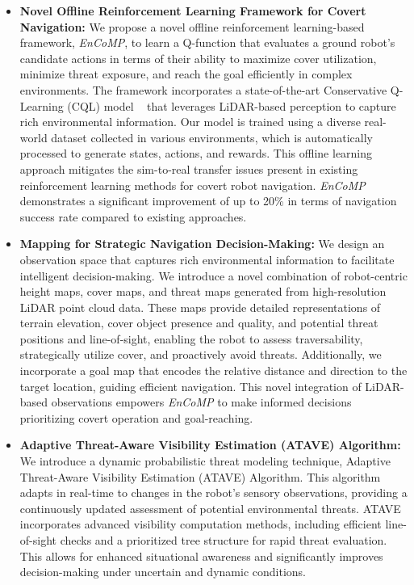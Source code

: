 \begin{itemize}
  \item \textbf{Novel Offline Reinforcement Learning Framework for Covert Navigation:}
  We propose a novel offline reinforcement learning-based framework, \textit{EnCoMP}, to learn a Q-function that evaluates a ground robot's candidate actions in terms of their ability to maximize cover utilization, minimize threat exposure, and reach the goal efficiently in complex environments. The framework incorporates a state-of-the-art Conservative Q-Learning (CQL) model ~\cite{kumar2020conservative} that leverages LiDAR-based perception to capture rich environmental information. Our model is trained using a diverse real-world dataset collected in various environments, which is automatically processed to generate states, actions, and rewards. This offline learning approach mitigates the sim-to-real transfer issues present in existing reinforcement learning methods for covert robot navigation. \textit{EnCoMP} demonstrates a significant improvement of up to 20\% in terms of navigation success rate compared to existing approaches.

  \item \textbf{Mapping for Strategic Navigation Decision-Making:}
   We design an observation space that captures rich environmental information to facilitate intelligent decision-making. We introduce a novel combination of robot-centric height maps, cover maps, and threat maps generated from high-resolution LiDAR point cloud data. These maps provide detailed representations of terrain elevation, cover object presence and quality, and potential threat positions and line-of-sight, enabling the robot to assess traversability, strategically utilize cover, and proactively avoid threats. Additionally, we incorporate a goal map that encodes the relative distance and direction to the target location, guiding efficient navigation. This novel integration of LiDAR-based observations empowers \textit{EnCoMP} to make informed decisions prioritizing covert operation and goal-reaching.

  \item \textbf{Adaptive Threat-Aware Visibility Estimation (ATAVE) Algorithm:}
We introduce a dynamic probabilistic threat modeling technique, Adaptive Threat-Aware Visibility Estimation (ATAVE) Algorithm. This algorithm adapts in real-time to changes in the robot's sensory observations, providing a continuously updated assessment of potential environmental threats. ATAVE incorporates advanced visibility computation methods, including efficient line-of-sight checks and a prioritized tree structure for rapid threat evaluation. This allows for enhanced situational awareness and significantly improves decision-making under uncertain and dynamic conditions.


\end{itemize}
